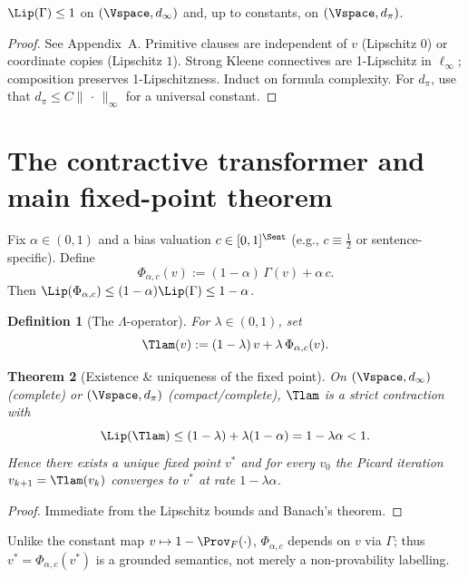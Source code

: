 \documentclass[12]{amsart}
\theoremstyle{plain}
\newtheorem{theorem}{Theorem}[section]
\newtheorem{definition}[theorem]{Definition}
\begin{document}
\begin{proposition}\label{prop:LipGamma}
$\Lip(\Gamma)\le 1$ on $(\Vspace,d_\infty)$ and, up to constants, on $(\Vspace,d_\pi)$.
\end{proposition}

\begin{proof}
See Appendix~A. Primitive clauses are independent of $v$ (Lipschitz $0$) or coordinate copies (Lipschitz $1$). Strong Kleene connectives are 1-Lipschitz in $\ell_\infty$; composition preserves 1-Lipschitzness. Induct on formula complexity. For $d_\pi$, use that $d_\pi\le C\|\,\cdot\,\|_\infty$ for a universal constant.
\end{proof}

\section{The contractive transformer and main fixed-point theorem}
\label{sec:contraction}

Fix $\alpha\in(0,1)$ and a bias valuation $c\in[0,1]^{\Sent}$ (e.g., $c\equiv \frac12$ or sentence-specific). Define
\[
\Phi_{\alpha,c}(v):=(1-\alpha)\,\Gamma(v)+\alpha\,c.
\]
Then $\Lip(\Phi_{\alpha,c})\le (1-\alpha)\Lip(\Gamma)\le 1-\alpha$.

\begin{definition}[The $\Lambda$-operator]
For $\lambda\in(0,1)$, set
\[
\Tlam(v):=(1-\lambda)\,v+\lambda\,\Phi_{\alpha,c}(v).
\]
\end{definition}

\begin{theorem}[Existence \& uniqueness of the fixed point]\label{thm:fixpoint}
On $(\Vspace,d_\infty)$ (complete) or $(\Vspace,d_\pi)$ (compact/complete), $\Tlam$ is a strict contraction with
\[
\Lip(\Tlam)\le (1-\lambda)+\lambda(1-\alpha)=1-\lambda\alpha<1.
\]
Hence there exists a unique fixed point $v^*$ and for every $v_0$ the Picard iteration $v_{k+1}=\Tlam(v_k)$ converges to $v^*$ at rate $1-\lambda\alpha$.
\end{theorem}

\begin{proof}
Immediate from the Lipschitz bounds and Banach's theorem.
\end{proof}

\begin{remark}
Unlike the constant map $v\mapsto 1-\Prov_F(\cdot)$, $\Phi_{\alpha,c}$ depends on $v$ via $\Gamma$; thus $v^*=\Phi_{\alpha,c}(v^*)$ is a grounded semantics, not merely a non-provability labelling.
\end{remark}
\end{document}
